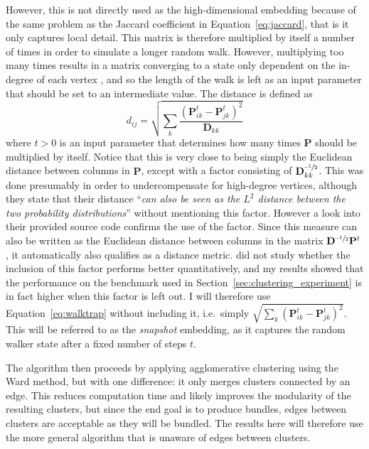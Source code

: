 However, this is not directly used as the high-dimensional embedding because of the same problem as the Jaccard coefficient in Equation~\eqref{eq:jaccard}, that is it only captures local detail. This matrix is therefore multiplied by itself a number of times in order to simulate a longer random walk. However, multiplying too many times results in a matrix converging to a state only dependent on the in-degree of each vertex \cite{Pons2006}, and so the length of the walk is left as an input parameter that should be set to an intermediate value.
The distance is defined as
\begin{equation}
  d_{ij} = \sqrt{\sum_{k}\frac{(\mathbf{P}_{ik}^t - \mathbf{P}_{jk}^t)^2}{\mathbf{D}_{kk}}}
  \label{eq:walktrap}
\end{equation}
where $t>0$ is an input parameter that determines how many times $\mathbf{P}$ should be multiplied by itself.
Notice that this is very close to being simply the Euclidean distance between columns in $\mathbf{P}$, except with a factor consisting of $\mathbf{D}_{kk}^{\text{--}\sfrac{1}{2}}$. This was done presumably in order to undercompensate for high-degree vertices, although they state that their distance ``\textit{can also be seen as the $L^2$ distance between the two probability distributions}'' \cite{Pons2006} without mentioning this factor. However a look into their provided source code confirms the use of the factor.
Since this measure can also be written as the Euclidean distance between columns in the matrix $\mathbf{D}^{\text{--}\sfrac{1}{2}}\mathbf{P}^t$, it automatically also qualifies as a distance metric.
\cite{Pons2006} did not study whether the inclusion of this factor performs better quantitatively, and my results showed that the performance on the benchmark used in Section~\ref{sec:clustering_experiment} is in fact higher when this factor is left out. I will therefore use Equation~\eqref{eq:walktrap} without including it, i.e.\ simply $\sqrt{\sum_{k}(\mathbf{P}_{ik}^t - \mathbf{P}_{jk}^t)^2}$. This will be referred to as the \emph{snapshot} embedding, as it captures the random walker state after a fixed number of steps $t$.

The algorithm then proceeds by applying agglomerative clustering using the Ward method, but with one difference: it only merges clusters connected by an edge. This reduces computation time and likely improves the modularity of the resulting clusters, but since the end goal is to produce bundles, edges between clusters are acceptable as they will be bundled. The results here will therefore use the more general algorithm that is unaware of edges between clusters.

